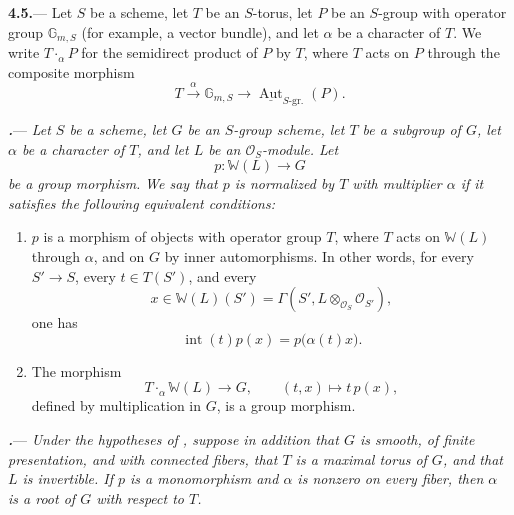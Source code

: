 \par\medskip\noindent
\textbf{4.5.}---
Let \(S\) be a scheme, let \(T\) be an \(S\)-torus, let \(P\) be an
\(S\)-group with operator group \(\mathbb G_{m,S}\)
\textup{(for example, a vector bundle)}, and let \(\alpha\) be a
character of \(T\).  We write \(T\mathbin{\cdot_\alpha}P\) for the
semidirect product of \(P\) by \(T\), where \(T\) acts on \(P\)
through the composite morphism
\[
  T
  \xrightarrow{\ \alpha\ }
  \mathbb G_{m,S}
  \longrightarrow
  \underline{\operatorname{Aut}}_{S\text{-gr.}}(P).
\]

\par\medskip\noindent
{}\textbf{\textit{.}}---
\textit{Let \(S\) be a scheme, let \(G\) be an \(S\)-group scheme,
let \(T\) be a subgroup of \(G\), let \(\alpha\) be a character of
\(T\), and let \(L\) be an \(\mathcal O_S\)-module.  Let}
\[
  p\colon\mathbb W(L)\longrightarrow G
\]
\textit{be a group morphism.}
\textit{We say that \(p\) is \emph{normalized by \(T\) with
multiplier \(\alpha\)} if it satisfies the following equivalent
conditions:}

\begin{enumerate}
\item[\textup{(i)}]
\(p\) is a morphism of objects with operator group \(T\), where \(T\)
acts on \(\mathbb W(L)\) through \(\alpha\), and on \(G\) by inner
automorphisms.  In other words, for every \(S'\to S\), every
\(t\in T(S')\), and every
\[
  x\in\mathbb W(L)(S')
  =
  \Gamma(S',L\otimes_{\mathcal O_S}\mathcal O_{S'}),
\]
one has
\[
  \operatorname{int}(t)p(x)=p\bigl(\alpha(t)x\bigr).
\]

\item[\textup{(ii)}]
The morphism
\[
  T\mathbin{\cdot_\alpha}\mathbb W(L)\longrightarrow G,
  \qquad
  (t,x)\longmapsto t\,p(x),
\]
defined by multiplication in \(G\), is a group morphism.
\end{enumerate}

\par\medskip\noindent
{}\textbf{\textit{.}}---
\textit{Under the hypotheses of , suppose in addition that \(G\)
is smooth, of finite presentation, and with connected fibers, that \(T\)
is a maximal torus of \(G\),
and that \(L\) is invertible.  If \(p\) is a monomorphism and
\(\alpha\) is nonzero on every fiber, then \(\alpha\) is a root of
\(G\) with respect to \(T\).}

